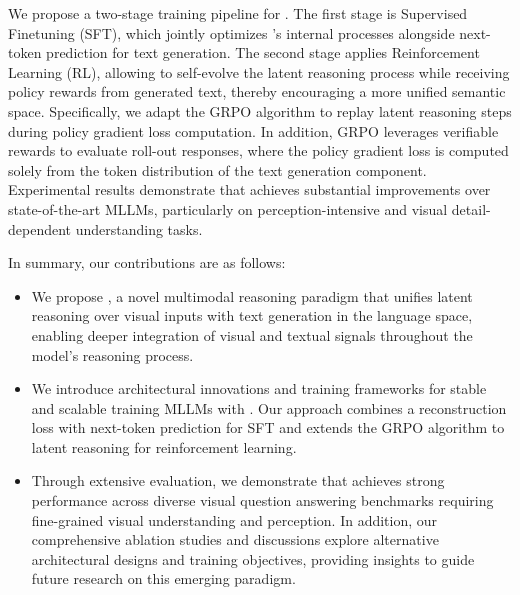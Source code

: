 We propose a two-stage training pipeline for \modelname. The first stage is Supervised Finetuning (SFT), which jointly optimizes \modelname’s internal processes alongside next-token prediction for text generation. The second stage applies Reinforcement Learning (RL), allowing \modelname to self-evolve the latent reasoning process while receiving policy rewards from generated text, thereby encouraging a more unified semantic space. Specifically, we adapt the GRPO algorithm \citep{grpo} to replay latent reasoning steps during policy gradient loss computation. In addition, GRPO leverages verifiable rewards to evaluate roll-out responses, where the policy gradient loss is computed solely from the token distribution of the text generation component. Experimental results demonstrate that \modelname achieves substantial improvements over state-of-the-art MLLMs, particularly on perception-intensive and visual detail-dependent understanding tasks.

In summary, our contributions are as follows:
\begin{itemize}[left=0pt]
\item We propose \modelfullname, a novel multimodal reasoning paradigm that unifies latent reasoning over visual inputs with text generation in the language space, enabling deeper integration of visual and textual signals throughout the model's reasoning process.
\item We introduce architectural innovations and training frameworks for stable and scalable training MLLMs with \modelname. Our approach combines a reconstruction loss with next-token prediction for SFT and extends the GRPO algorithm to latent reasoning for reinforcement learning.
\item Through extensive evaluation, we demonstrate that \modelname achieves strong performance across diverse visual question answering benchmarks requiring fine-grained visual understanding and perception. In addition, our comprehensive ablation studies and discussions explore alternative architectural designs and training objectives, providing insights to guide future research on this emerging paradigm.
\end{itemize}




